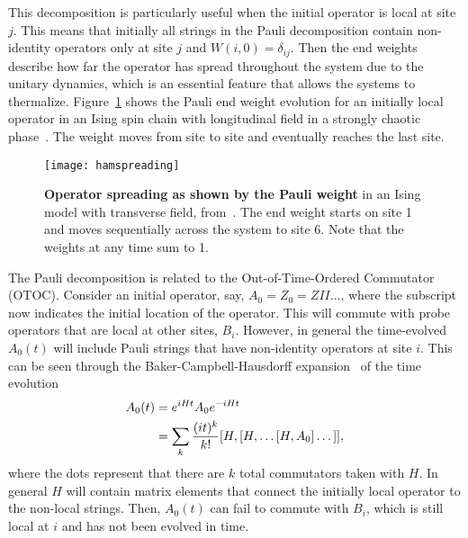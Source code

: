 This decomposition is particularly useful when the initial operator is local at site $j$. This means that initially all strings in the Pauli decomposition contain non-identity operators only at site $j$ and $W(i,0)=\delta_{ij}$. Then the end weights describe how far the operator has spread throughout the system due to the unitary dynamics, which is an essential feature that allows the systems to thermalize. Figure~\ref{fig:hamspreading} shows the Pauli end weight evolution for an initially local operator in an Ising spin chain with longitudinal field in a strongly chaotic phase~\cite{Jonay17}. The weight moves from site to site and eventually reaches the last site.

\begin{figure}
	\centering
	\texttt{[image: hamspreading]}
	\caption{\textbf{Operator spreading as shown by the Pauli weight} in an Ising model with transverse field, from~\cite{Jonay17}. The end weight starts on site 1 and moves sequentially across the system to site 6. Note that the weights at any time sum to 1.}
	\label{fig:hamspreading}
\end{figure}

The Pauli decomposition is related to the Out-of-Time-Ordered Commutator (OTOC). Consider an initial operator, say, $A_0=Z_0=ZII\dots$, where the subscript now indicates the initial location of the operator. This will commute with probe operators that are local at other sites, $B_i$. However, in general the time-evolved $A_0(t)$ will include Pauli strings that have non-identity operators at site $i$. This can be seen through the Baker-Campbell-Hausdorff expansion~\cite{Roberts2016} of the time evolution
\begin{align}
A_0(t) &= e^{iHt}A_0e^{-iHt} \nonumber\\
&= \sum_k\frac{(it)^k}{k!}[H,[H,\dots[H,A_0]\dots]],\label{eqn:BCH}
\end{align}
where the dots represent that there are $k$ total commutators taken with $H$.
In general $H$ will contain matrix elements that connect the initially local operator to the non-local strings. Then, $A_0(t)$ can fail to commute with $B_i$, which is still local at $i$ and has not been evolved in time.

